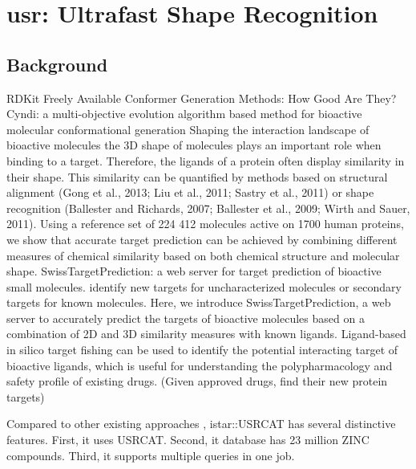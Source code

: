 \chapter{usr: Ultrafast Shape Recognition}

\section{Background}

RDKit
\citep{1127} Freely Available Conformer Generation Methods: How Good Are They?
\citep{1393,1394} Cyndi: a multi-objective evolution algorithm based method for bioactive molecular conformational generation
\citep{1407} Shaping the interaction landscape of bioactive molecules
\citep{1407} the 3D shape of molecules plays an important role when binding to a target. Therefore, the ligands of a protein often display similarity in their shape. This similarity can be quantified by methods based on structural alignment (Gong et al., 2013; Liu et al., 2011; Sastry et al., 2011) or shape recognition (Ballester and Richards, 2007; Ballester et al., 2009; Wirth and Sauer, 2011).
\citep{1407} Using a reference set of 224 412 molecules active on 1700 human proteins, we show that accurate target prediction can be achieved by combining different measures of chemical similarity based on both chemical structure and molecular shape.
\citep{1408} SwissTargetPrediction: a web server for target prediction of bioactive small molecules. identify new targets for uncharacterized molecules or secondary targets for known molecules. Here, we introduce SwissTargetPrediction, a web server to accurately predict the targets of bioactive molecules based on a combination of 2D and 3D similarity measures with known ligands.
\citep{1402} Ligand-based in silico target fishing can be used to identify the potential interacting target of bioactive ligands, which is useful for understanding the polypharmacology and safety profile of existing drugs. (Given approved drugs, find their new protein targets)

Compared to other existing approaches \citep{1333,1334,1335,1337,1338,1331}, istar::USRCAT has several distinctive features. First, it uses USRCAT. Second, it database has 23 million ZINC compounds. Third, it supports multiple queries in one job.

\chapterend
